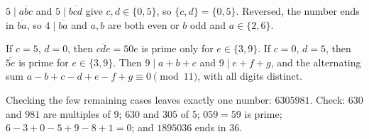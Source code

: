 $5\mid\overline{abc}$ and $5\mid\overline{bcd}$ give $c,d\in\{0,5\}$, so $\{c,d\}=\{0,5\}$. Reversed, the number ends in $\overline{ba}$, so $4\mid\overline{ba}$ and $a,b$ are both even or $b$ odd and $a\in\{2,6\}$.

If $c=5$, $d=0$, then $\overline{cde}=50e$ is prime only for $e\in\{3,9\}$. If $c=0$, $d=5$, then $\overline{5e}$ is prime for $e\in\{3,9\}$. Then $9\mid a+b+c$ and $9\mid e+f+g$, and the alternating sum $a-b+c-d+e-f+g\equiv0\pmod{11}$, with all digits distinct.

Checking the few remaining cases leaves exactly one number: $\boxed{6305981}$. Check: $630$ and $981$ are multiples of $9$; $630$ and $305$ of $5$; $059=59$ is prime; $6-3+0-5+9-8+1=0$; and $1895036$ ends in $36$.
